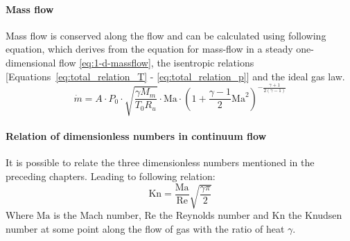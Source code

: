 	\paragraph{Mass flow}
		Mass flow is conserved along the flow and can be calculated using following equation, which derives from the equation for mass-flow in a steady one-dimensional flow \eqref{eq:1-d-massflow}, the isentropic relations [Equations~\eqref{eq:total_relation_T} - \eqref{eq:total_relation_p}] and the ideal gas law.
		\cite{benson_mass_nodate}
		\begin{equation}
			\dot{m} = A \cdot P_0 \cdot \sqrt{\frac{\gamma M_m}{T_0 R_u}} \cdot \mathrm{Ma}\cdot \left(1 + \frac{\gamma - 1}{2} \mathrm{Ma}^2\right)^{-\frac{\gamma + 1}{2(\gamma - 1)}}
			\label{eq:1-d-massflow}
		\end{equation}
	\paragraph{Relation of dimensionless numbers in continuum flow}
		It is possible to relate the three dimensionless numbers mentioned in the preceding chapters.
		Leading to following relation:
		\begin{equation}
			\mathrm{Kn} = \frac{\mathrm{Ma}}{\mathrm{Re}} \sqrt{\frac{\gamma \pi}{2}}
			\label{eq:nondim-relation}
		\end{equation}
		Where $\mathrm{Ma}$ is the Mach number, $\mathrm{Re}$ the Reynolds number and $\mathrm{Kn}$ the Knudsen number at some point along the flow of gas with the ratio of heat $\gamma$.
		\cite{Cengel2017, LiLam1964, EMMONS1958}
